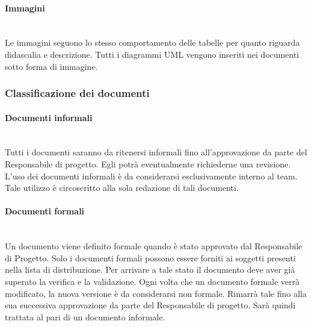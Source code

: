 		\paragraph{Immagini} \mbox{}\\
		Le immagini seguono lo stesso comportamento delle tabelle per quanto riguarda didascalia e descrizione. Tutti i diagrammi UML vengono inseriti nei documenti sotto forma di immagine.
		\subsubsection{Classificazione dei documenti}
		\paragraph{Documenti informali} \mbox{}\\
		Tutti i documenti saranno da ritenersi informali fino all’approvazione da parte del Responsabile di progetto. Egli potrà eventualmente richiederne una revisione. L’uso dei documenti informali è da considerarsi esclusivamente interno al team. Tale utilizzo è circoscritto alla sola redazione di tali documenti.
		\paragraph{Documenti formali} \mbox{}\\
		Un documento viene definito formale quando è stato approvato dal	Responsabile di Progetto. Solo i documenti formali possono essere forniti ai soggetti presenti nella lista di distribuzione. Per arrivare a tale stato il documento deve aver già superato la verifica e la validazione.
		Ogni volta che un documento formale verrà modificato, la nuova
		versione è da considerarsi non formale. Rimarrà tale fino alla sua successiva approvazione da parte del Responsabile di progetto. Sarà quindi trattata al pari di un documento informale.
